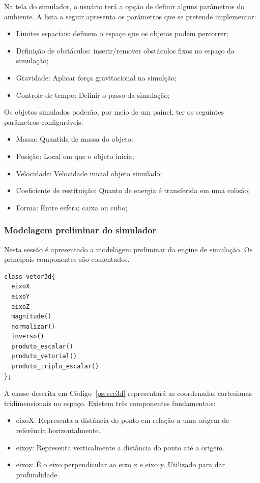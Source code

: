 Na tela do simulador, o usuário terá a opção de definir alguns parâmetros do ambiente. A lista a seguir apresenta os parâmetros que se pretende implementar:
\begin{itemize}
  \item Limites espaciais: definem o espaço que os objetos podem percorrer;
  \item Definição de obstáculos: inserir/remover obstáculos fixos no espaço da simulação;
  \item Gravidade: Aplicar força gravitacional na simulção;
  \item Controle de tempo: Definir o passo da simulação;   
\end{itemize}
 
Os objetos simulados poderão, por meio de um painel, ter os seguintes parâmetros configuráveis: 
\begin{itemize}
\item Massa: Quantida de massa do objeto; 
\item Posição: Local em que o objeto inicia;
\item Velocidade: Velocidade inicial objeto simulado; 
\item Coeficiente de restituição: Quanto de energia é transferida em uma colisão;
\item Forma: Entre esfera; caixa ou cubo; 
\end{itemize}

\subsubsection{Modelagem preliminar do simulador}
Nesta sessão é apresentado a modelagem preliminar da engine de simulação. Os principais componentes são comentados.

\begin{lstlisting}[frame=single,caption=Modelagem prévia para vetor3d\label{ps:vec3d}]
class vetor3d{
  eixoX
  eixoY
  eixoZ
  magnitude()
  normalizar()
  inverso()
  produto_escalar()
  produto_vetorial()
  produto_triplo_escalar()
};
\end{lstlisting}

A classe descrita em Código~\ref{ps:vec3d} representará as coordenadas cartesianas tridimensionais no espaço.
Existem três componentes fundamentais:
\begin{itemize}
  \item eixoX: Representa a distância do ponto em relação a uma origem de referência horizontalmente.
  \item eixoy: Representa verticalmente a distância do ponto até a origem.
  \item eixoz: É o eixo perpendicular ao eixo x e eixo y. Utilizado para dar profundidade.
\end{itemize}

